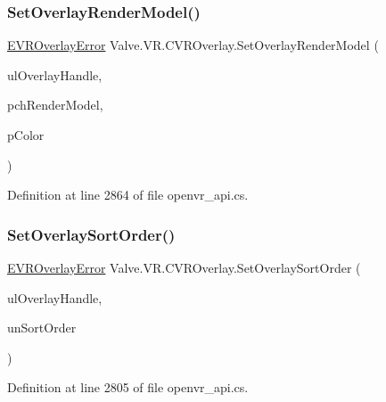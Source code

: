\mbox{\label{class_valve_1_1_v_r_1_1_c_v_r_overlay_a6bb90e328dc2817d2c27f697c7f8e2bc}} 
\subsubsection{\texorpdfstring{SetOverlayRenderModel()}{SetOverlayRenderModel()}}
{\footnotesize\ttfamily \mbox{\hyperlink{namespace_valve_1_1_v_r_aaee5c5144f42b7969d45b854f51b0c18}{E\+V\+R\+Overlay\+Error}} Valve.\+V\+R.\+C\+V\+R\+Overlay.\+Set\+Overlay\+Render\+Model (\begin{DoxyParamCaption}\item[{ulong}]{ul\+Overlay\+Handle,  }\item[{string}]{pch\+Render\+Model,  }\item[{ref \mbox{\hyperlink{struct_valve_1_1_v_r_1_1_hmd_color__t}{Hmd\+Color\+\_\+t}}}]{p\+Color }\end{DoxyParamCaption})}



Definition at line 2864 of file openvr\+\_\+api.\+cs.

\mbox{\label{class_valve_1_1_v_r_1_1_c_v_r_overlay_a457d52502206c08eec6d881bacd7e8ec}} 
\subsubsection{\texorpdfstring{SetOverlaySortOrder()}{SetOverlaySortOrder()}}
{\footnotesize\ttfamily \mbox{\hyperlink{namespace_valve_1_1_v_r_aaee5c5144f42b7969d45b854f51b0c18}{E\+V\+R\+Overlay\+Error}} Valve.\+V\+R.\+C\+V\+R\+Overlay.\+Set\+Overlay\+Sort\+Order (\begin{DoxyParamCaption}\item[{ulong}]{ul\+Overlay\+Handle,  }\item[{uint}]{un\+Sort\+Order }\end{DoxyParamCaption})}



Definition at line 2805 of file openvr\+\_\+api.\+cs.

